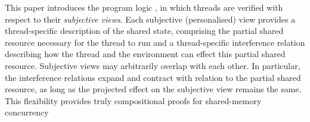 This paper introduces the program logic \colosl, in which threads are
verified with respect to their \emph{subjective views}. Each
subjective (personalised) view provides a thread-specific description
of the shared state, comprising the partial shared resource necessary
for the thread to run and a thread-specific interference relation
describing how the thread and the environment can effect this partial
shared resource. Subjective views may arbitrarily overlap with each
other.  In particular, the interference relations expand and contract
with relation to the partial shared resource, as long as the projected
effect on the subjective view remains the same.  This flexibility
provides truly compositional proofs for shared-memory concurrency









